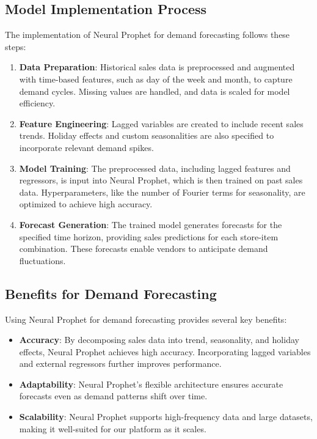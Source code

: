 \subsection{Model Implementation Process}

The implementation of Neural Prophet for demand forecasting follows these steps:

\begin{enumerate}
    \item \textbf{Data Preparation}: Historical sales data is preprocessed and augmented with time-based features, such as day of the week and month, to capture demand cycles. Missing values are handled, and data is scaled for model efficiency.

    \item \textbf{Feature Engineering}: Lagged variables are created to include recent sales trends. Holiday effects and custom seasonalities are also specified to incorporate relevant demand spikes.

    \item \textbf{Model Training}: The preprocessed data, including lagged features and regressors, is input into Neural Prophet, which is then trained on past sales data. Hyperparameters, like the number of Fourier terms for seasonality, are optimized to achieve high accuracy.

    \item \textbf{Forecast Generation}: The trained model generates forecasts for the specified time horizon, providing sales predictions for each store-item combination. These forecasts enable vendors to anticipate demand fluctuations.
\end{enumerate}

\subsection{Benefits for Demand Forecasting}

Using Neural Prophet for demand forecasting provides several key benefits:

\begin{itemize}
    \item \textbf{Accuracy}: By decomposing sales data into trend, seasonality, and holiday effects, Neural Prophet achieves high accuracy. Incorporating lagged variables and external regressors further improves performance.

    \item \textbf{Adaptability}: Neural Prophet’s flexible architecture ensures accurate forecasts even as demand patterns shift over time.

    \item \textbf{Scalability}: Neural Prophet supports high-frequency data and large datasets, making it well-suited for our platform as it scales.
\end{itemize}

